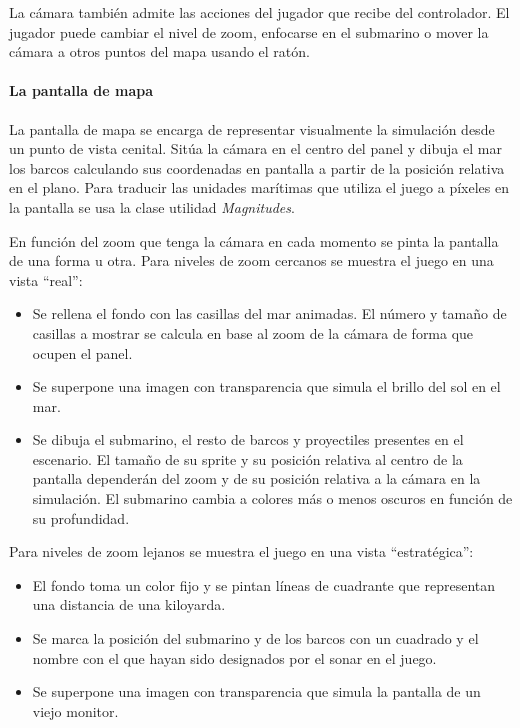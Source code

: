 \documentclass[a4paper,
	11pt,
	parskip=full,
	bibliography=totoc,
	twoside
	]{scrartcl}
\begin{document}
			La cámara también admite las acciones del jugador que recibe del controlador. El jugador puede cambiar el nivel de zoom, enfocarse en el submarino o mover la cámara a otros puntos del mapa usando el ratón.
			
		\paragraph{La pantalla de mapa}
			La pantalla de mapa se encarga de representar visualmente la simulación desde un punto de vista cenital. Sitúa la cámara en el centro del panel y dibuja el mar los barcos calculando sus coordenadas en pantalla a partir de la posición relativa en el plano. Para traducir las unidades marítimas que utiliza el juego a píxeles en la pantalla se usa la clase utilidad \textit{Magnitudes}.
			
			En función del zoom que tenga la cámara en cada momento se pinta la pantalla de una forma u otra. Para niveles de zoom cercanos se muestra el juego en una vista ``real'':
			
			\begin{itemize}[noitemsep]
				\item Se rellena el fondo con las casillas del mar animadas. El número y tamaño de casillas a mostrar se calcula en base al zoom de la cámara de forma que ocupen el panel.
				\item Se superpone una imagen con transparencia que simula el brillo del sol en el mar.
				\item Se dibuja el submarino, el resto de barcos y proyectiles presentes en el escenario. El tamaño de su sprite y su posición relativa al centro de la pantalla dependerán del zoom y de su posición relativa a la cámara en la simulación. El submarino cambia a colores más o menos oscuros en función de su profundidad.
			\end{itemize}
		
			Para niveles de zoom lejanos se muestra el juego en una vista ``estratégica'':
			
			\begin{itemize}[noitemsep]
				\item El fondo toma un color fijo y se pintan líneas de cuadrante que representan una distancia de una kiloyarda.
				\item Se marca la posición del submarino y de los barcos con un cuadrado y el nombre con el que hayan sido designados por el sonar en el juego.
				\item Se superpone una imagen con transparencia que simula la pantalla de un viejo monitor.
			\end{itemize}
		
\end{document}
